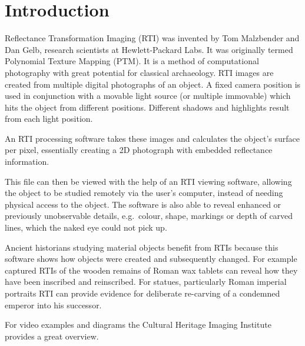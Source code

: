 \section{Introduction}
Reflectance Transformation Imaging (RTI) was  invented by Tom Malzbender and Dan
Gelb, research scientists at Hewlett-Packard Labs. It was originally termed
Polynomial Texture Mapping (PTM). It is a method of computational photography
with great potential for classical archaeology. RTI images are created from
multiple digital photographs of an object. A fixed camera position is used in
conjunction with a movable light source (or multiple immovable) which hits the
object from different positions. Different shadows and highlights result from
each light position.

An RTI processing software takes these images and calculates the object's
surface per pixel, essentially creating a 2D photograph with embedded
reflectance information.

This file can then be viewed with the help of an RTI viewing software, allowing
the object to be studied remotely via the user's computer, instead of needing
physical access to the object. The software is also able to reveal enhanced or
previously unobservable details, e.g.\ colour, shape, markings or depth of
carved lines, which the naked eye could not pick up.

Ancient historians studying material objects benefit from RTIs because this
software shows how objects were created and subsequently changed. For example
captured RTIs of the wooden remains of Roman wax tablets can reveal how they
have been inscribed and reinscribed. For statues, particularly Roman imperial
portraits RTI can provide evidence for deliberate re-carving of a condemned
emperor into his successor.

For video examples and diagrams the Cultural Heritage Imaging Institute provides a great overview\cite*{noauthor_cultural_nodate}.


